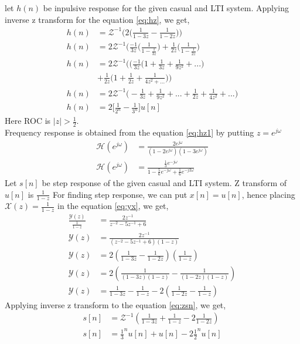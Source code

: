 \documentclass[journal,12pt,two column]{IEEEtran}
\begin{document}
\begin{enumerate}
let $h(n)$ be inpulsive response for the given casual and LTI system. Applying inverse z transform for the equation \eqref{eq:hz}, 
we get,
\begin{align}
h(n)&=\mathcal{Z}^{-1}\bigg(2\bigg(\frac{1}{1-3z}-\frac{1}{1-2z}\bigg)\bigg)\\
h(n)&=2\mathcal{Z}^{-1}\bigg(\frac{-1}{3z}\bigg(\frac{1}{1-\frac{1}{3z}}\bigg)+\frac{1}{2z}\bigg(\frac{1}{1-\frac{1}{2z}}\bigg)\\
h(n)&=2\mathcal{Z}^{-1}\bigg(\bigg(\frac{-1}{3z}(1+\frac{1}{3z}+\frac{1}{9z^{2}}+...\bigg)\\&+\frac{1}{2z}\bigg(1+\frac{1}{2z}+\frac{1}{4z^{2}+...}\bigg)\bigg)\\
h(n)&=2\mathcal{Z}^{-1}\bigg(-\frac{1}{3z}+\frac{1}{9z^{2}}+...+\frac{1}{2z}+\frac{1}{4z^{2}}+...\bigg)\\
h(n)&=2\bigg[\frac{1}{2^{n}}-\frac{1}{3^{n}}\bigg]u[n]
\end{align}
Here ROC is $|z|>\frac{1}{2}$.\\
Frequency response is obtained from the equation \eqref{eq:hz1} by putting $z=e^{j\omega}$
\begin{align}	
	\mathcal{H}(e^{j\omega})&=\frac{2e^{j\omega}}{(1-2e^{j\omega})(1-3e^{j\omega})}\\
\mathcal{H}(e^{j\omega})&=\frac{\frac{1}{3}e^{-j\omega}}{1-\frac{5}{6} e^{-j\omega}+\frac{1}{6} e^{-j2\omega}}
\end{align}
Let $s[n]$ be step response of the given casual and LTI system.
Z transform of $u[n]$ is $\frac{1}{1-z}$
For finding step response, we can put $x[n]=u[n]$, hence placing $\mathcal{X}(z)=\frac{1}{1-z}$ in the equation \eqref{eq:yx}, we get,
\begin{align}
	\frac{\mathcal{Y}(z)}{\frac{1}{1-z}}&=\frac{2z^{-1}}{z^{-2}-5z^{-1}+6}\\
	\mathcal{Y}(z)&=\frac{2z^{-1}}{(z^{-2}-5z^{-1}+6)(1-z)}\\
	\mathcal{Y}(z)&=2(\frac{1}{1-3z}-\frac{1}{1-2z})(\frac{1}{1-z})\\
	\mathcal{Y}(z)&=2(\frac{1}{(1-3z)(1-z)}-\frac{1}{(1-2z)(1-z)})\\
	\label{eq:zsn}	
	\mathcal{Y}(z)&=\frac{1}{1-3z}-\frac{1}{1-z}-2(\frac{1}{1-2z}-\frac{1}{1-z})
\end{align}
Applying inverse z transform to the equation \eqref{eq:zsn}, we get,
\begin{align}
s[n]&=\mathcal{Z}^{-1}(\frac{1}{1-3z}+\frac{1}{1-z}-2 \frac{1}{1-2z})\\
s[n]&=\frac{1}{3}^{n} u[n] +u[n] -2 \frac{1}{2}^{n} u[n] \\

\end{align}
\end{enumerate}
\end{document}
